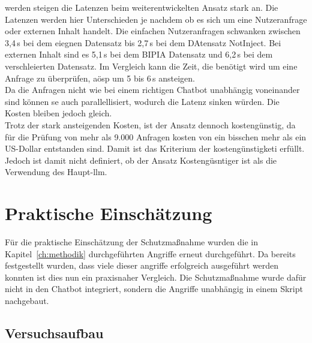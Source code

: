 werden steigen die Latenzen beim weiterentwickelten Ansatz stark an. Die Latenzen werden hier Unterschieden je nachdem ob es sich um eine Nutzeranfrage oder externen
Inhalt handelt. Die einfachen Nutzeranfragen schwanken zwischen 3,4\,s bei dem eiegnen Datensatz bis 2,7\,s bei dem DAtensatz NotInject. Bei externen Inhalt 
sind es 5,1\,s bei dem BIPIA Datensatz und 6,2\,s bei dem verschleierten Datensatz. Im Vergleich kann die Zeit, die benötigt wird um eine Anfrage zu überprüfen, aösp
um 5 bis 6\,s ansteigen. \\
Da die Anfragen nicht wie bei einem richtigen Chatbot unabhängig voneinander sind können se auch parallellisiert, wodurch die Latenz sinken würden. Die Kosten bleiben
jedoch gleich. \\
Trotz der stark ansteigenden Kosten, ist der Ansatz dennoch kostengünstig, da für die Prüfung von mehr als 9.000 Anfragen kosten von ein bisschen mehr als ein US-Dollar
entstanden sind. Damit ist das Kriterium der kostengünstigketi erfüllt. Jedoch ist damit nicht definiert, ob der Ansatz Kostengüsntiger ist als die Verwendung des
Haupt-\ac{llm}. 

\section{Praktische Einschätzung}

Für die praktische Einschätzung der Schutzmaßnahme wurden die in Kapitel~\ref{ch:methodik} durchgeführten Angriffe erneut durchgeführt. Da bereits festgestellt wurden,
dass viele dieser angriffe erfolgreich ausgeführt werden konnten ist dies nun ein praxisnaher Vergleich. Die Schutzmaßnahme wurde dafür nicht in den Chatbot
integriert, sondern die Angriffe unabhängig in einem Skript nachgebaut. 

\subsection{Versuchsaufbau}

